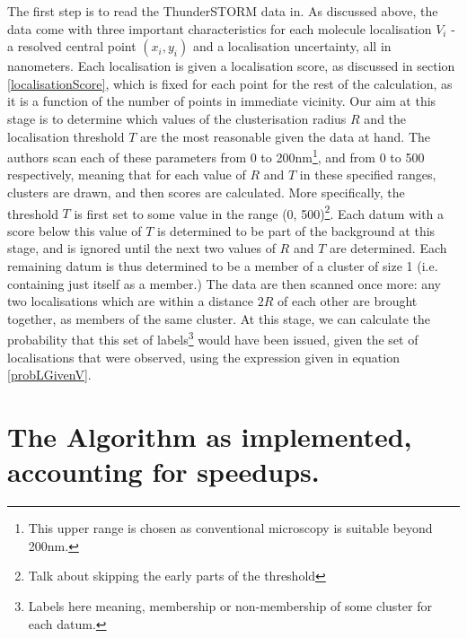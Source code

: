 \documentclass[11pt]{article}
\begin{document}
The first step is to read the ThunderSTORM data in. As discussed above, the data come with three important characteristics for each molecule localisation $V_i$ - a resolved central point $(x_i, y_i)$ and a localisation uncertainty, all in nanometers. Each localisation is given a localisation score, as discussed in section \ref{localisationScore}, which is fixed for each point for the rest of the calculation, as it is a function of the number of points in immediate vicinity. Our aim at this stage is to determine which values of the clusterisation radius $R$ and the localisation threshold $T$ are the most reasonable given the data at hand. The authors scan each of these parameters from 0 to 200nm\footnote{This upper range is chosen as conventional microscopy is suitable beyond 200nm.}, and from 0 to 500 respectively, meaning that for each value of $R$ and $T$ in these specified ranges, clusters are drawn, and then scores are calculated. More specifically, the threshold $T$ is first set to some value in the range (0, 500)\footnote{Talk about skipping the early parts of the threshold}. Each datum with a score below this value of $T$ is determined to be part of the background at this stage, and is ignored until the next two values of $R$ and $T$ are determined. Each remaining datum is thus determined to be a member of a cluster of size 1 (i.e. containing just itself as a member.) The data are then scanned once more: any two localisations which are within a distance $2R$ of each other are brought together, as members of the same cluster. At this stage, we can calculate the probability that this set of labels\footnote{Labels here meaning, membership or non-membership of some cluster for each datum.} would have been issued, given the set of localisations that were observed, using the expression given in equation \ref{probLGivenV}. 


\section{The Algorithm as implemented, accounting for speedups.} \label{algImplementation}

\end{document}
